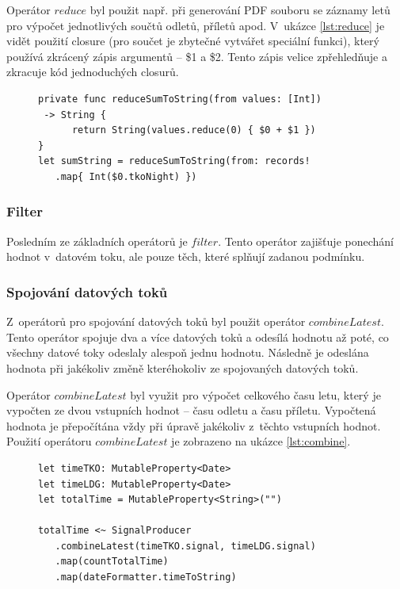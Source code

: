 \documentclass[thesis=M,czech]{FITthesis}[2012/06/26]
\begin{document}
Operátor $reduce$ byl použit např. při generování PDF souboru se záznamy letů pro výpočet jednotlivých součtů odletů, příletů apod. V~ukázce \ref{lst:reduce} je vidět použití closure (pro součet je zbytečné vytvářet speciální funkci), který používá zkrácený zápis argumentů -- \$1 a \$2. Tento zápis velice zpřehledňuje a zkracuje kód jednoduchých closurů.

\begin{figure}
\begin{minipage}{\linewidth}
\begin{lstlisting}[caption={Ukázka použití Reduce},label={lst:reduce}]
private func reduceSumToString(from values: [Int])
 -> String {
      return String(values.reduce(0) { $0 + $1 })
}
let sumString = reduceSumToString(from: records!
   .map{ Int($0.tkoNight) })
\end{lstlisting}
\end{minipage}
\end{figure}

\subsubsection{Filter}
Posledním ze základních operátorů je $filter$. Tento operátor zajišťuje ponechání hodnot v~datovém toku, ale pouze těch, které splňují zadanou podmínku.\cite{operators}

\subsubsection{Spojování datových toků}
Z~operátorů pro spojování datových toků byl použit operátor $combineLatest$. Tento operátor spojuje dva a více datových toků a odesílá hodnotu až poté, co všechny datové toky odeslaly alespoň jednu hodnotu. Následně je odeslána hodnota při jakékoliv změně kteréhokoliv ze spojovaných datových toků. \cite{operators}

Operátor $combineLatest$ byl využit pro výpočet celkového času letu, který je vypočten ze dvou vstupních hodnot -- času odletu a času příletu. Vypočtená hodnota je přepočítána vždy při úpravě jakékoliv z~těchto vstupních hodnot. Použití operátoru $combineLatest$ je zobrazeno na ukázce \ref{lst:combine}.

\begin{figure}
\begin{minipage}{\linewidth}
\begin{lstlisting}[caption={Ukázka použití spojení dvou datových toků},label={lst:combine}]
let timeTKO: MutableProperty<Date>
let timeLDG: MutableProperty<Date>
let totalTime = MutableProperty<String>("")

totalTime <~ SignalProducer
   .combineLatest(timeTKO.signal, timeLDG.signal)
   .map(countTotalTime)
   .map(dateFormatter.timeToString)
\end{lstlisting}
\end{minipage}
\end{figure}
\end{document}
